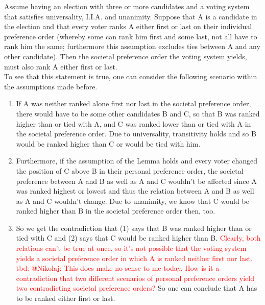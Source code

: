 Assume having an election with three or more candidates and a voting system that satisfies universality, I.I.A. and unanimity. Suppose that A is a candidate in the election and that every voter ranks A either first or last on their individual preference order (whereby some can rank him first and some last, not all have to rank him the same; furthermore this assumption excludes ties between A and any other candidate). Then the societal preference order the voting system yields, must also rank A either first or last. \\
\noindent To see that this statement is true, one can consider the following scenario within the assumptions made before. 
\begin{enumerate} 
\item If A was neither ranked alone first nor last in the societal preference order, there would have to be some other candidates B and C, so that B was ranked higher than or tied with A, and C was ranked lower than or tied with A in the societal preference order. 
Due to universality, transitivity holds and so B would be ranked higher than C or would be tied with him. 

\item Furthermore, if the assumption of the Lemma holds and every voter changed the position of C above B in their personal preference order, the societal preference between A and B as well as A and C wouldn't be affected since A was ranked highest or lowest and thus the relation between A and B as well as A and C wouldn't change. Due to unanimity, we know that C would be ranked higher than B in the societal preference order then, too. 

\item So we get the contradiction that (1) says that B was ranked higher than or tied with C and (2) says that C would be ranked higher than B. \textcolor{red}{Clearly, both relations can't be true at once, so it's not possible that the voting system yields a societal preference order in which A is ranked neither first nor last. tbd: @Nikolaj: This does make no sense to me today. How is it a contradiction that two different scenarios of personal preference orders yield two contradicting societal preference orders?} So one can conclude that A has to be ranked either first or last. 
\end{enumerate}

